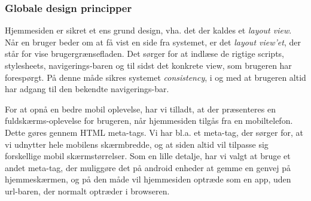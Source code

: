 \subsubsection{Globale design principper}
Hjemmesiden er sikret et ens grund design, vha. det der kaldes et \textit{layout view}.
Når en bruger beder om at få vist en side fra systemet, er det \textit{layout view'et}, der står for vise brugergrænsefladen.
Det sørger for at indlæse de rigtige scripts, stylesheets, navigerings-baren og til sidst det konkrete view, som brugeren har forespørgt.
På denne måde sikres systemet \textit{consistency}, i og med at brugeren altid har adgang til den bekendte navigerings-bar.

For at opnå en bedre mobil oplevelse, har vi tilladt, at der præsenteres en fuldskærms-oplevelse for brugeren, når hjemmesiden tilgås fra en mobiltelefon.
Dette gøres gennem HTML meta-tags.
Vi har bl.a. et meta-tag, der sørger for, at vi udnytter hele mobilens skærmbredde, og at siden altid vil tilpasse sig forskellige mobil skærmstørrelser.
Som en lille detalje, har vi valgt at bruge et andet meta-tag, der muliggøre det på android enheder at gemme en genvej på hjemmeskærmen, og på den måde vil hjemmesiden optræde som en app, uden url-baren, der normalt optræder i browseren.


